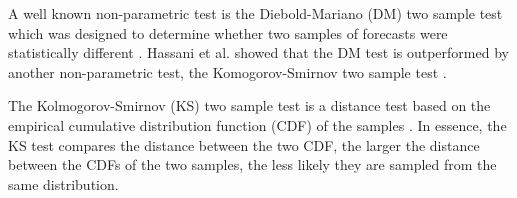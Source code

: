 A well known non-parametric test is the Diebold-Mariano (DM) two sample test which was designed to determine whether two samples of forecasts were statistically different \cite{diebold2015comparing}. Hassani et al. showed that the DM test is outperformed by another non-parametric test, the Komogorov-Smirnov two sample test \cite{hassani2015kolmogorov}.

The Kolmogorov-Smirnov (KS) two sample test is a distance test based on the empirical cumulative distribution function (CDF) of the samples \cite{massey1951kolmogorov}. In essence, the KS test compares the distance between the two CDF, the larger the distance between the CDFs of the two samples, the less likely they are sampled from the same distribution.
